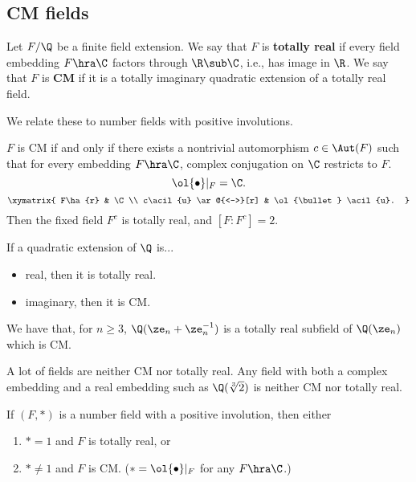 \subsection{CM fields}
\begin{df}
Let $F/\Q$ be a finite field extension. We say that $F$ is \textbf{totally real} if every field embedding $F\hra \C$ factors through $\R\sub \C$, i.e., has image in $\R$. We say that $F$ is \textbf{CM} if it is a totally imaginary quadratic extension of a totally real field.
\end{df}
We relate these to number fields with positive involutions.
\begin{lem}
$F$ is CM if and only if there exists a nontrivial automorphism $c\in \Aut(F)$ such that for every embedding $F\hra \C$, complex conjugation on $\C$ restricts to $F$.
\[
\ol{\bullet}|_{F}=\C.
\]
\[
\xymatrix{
F\ha{r} & \C\\
c\acil{u} \ar@{<->}[r] & \ol{\bullet} \acil{u}.
}
\]
Then the fixed field $F^c$ is totally real, and $[F:F^c]=2$.
\end{lem}
\begin{ex}
If a quadratic extension of $\Q$ is...
\begin{itemize}
\item
real, then it is totally real.
\item 
imaginary, then it is CM.
\end{itemize}
We have that, for $n\ge 3$, $\Q(\ze_n+\ze_n^{-1})$ is a totally real subfield of $\Q(\ze_n)$ which is CM.
\end{ex}
A lot of fields are neither CM nor totally real. Any field with both a complex embedding and a real embedding such as $\Q(\sqrt[3]2)$ is neither CM nor totally real.
\begin{lem}
If $(F,*)$ is a number field with a positive involution, then either
\begin{enumerate}
\item
$*=1$ and $F$ is totally real, or
\item
$*\ne 1$ and $F$ is CM. ($*=\ol{\bullet}|_F$ for any $F\hra \C$.)
\end{enumerate}
\end{lem}

